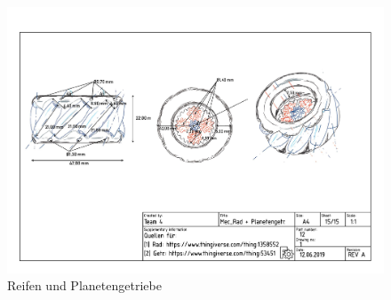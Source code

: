 \begin{figure}[ht!]
	\includegraphics[width=\textwidth]{../techzeich/12.PDF} 	
	\caption{Reifen und Planetengetriebe}
\end{figure}